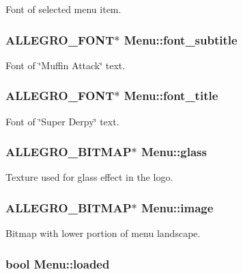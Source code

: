 Font of selected menu item. \hypertarget{structMenu_a18d7377e798bac336e55e253243d4e13}{
\subsubsection[{font\-\_\-subtitle}]{\setlength{\rightskip}{0pt plus 5cm}A\-L\-L\-E\-G\-R\-O\-\_\-\-F\-O\-N\-T$\ast$ Menu\-::font\-\_\-subtitle}}\label{structMenu_a18d7377e798bac336e55e253243d4e13}
Font of \char`\"{}\-Muffin Attack\char`\"{} text. \hypertarget{structMenu_aac0297cac51099ec75020a510a6dcbb3}{
\subsubsection[{font\-\_\-title}]{\setlength{\rightskip}{0pt plus 5cm}A\-L\-L\-E\-G\-R\-O\-\_\-\-F\-O\-N\-T$\ast$ Menu\-::font\-\_\-title}}\label{structMenu_aac0297cac51099ec75020a510a6dcbb3}
Font of \char`\"{}\-Super Derpy\char`\"{} text. \hypertarget{structMenu_ad9d4472398e580ffb12c7d7773e8cab8}{
\subsubsection[{glass}]{\setlength{\rightskip}{0pt plus 5cm}A\-L\-L\-E\-G\-R\-O\-\_\-\-B\-I\-T\-M\-A\-P$\ast$ Menu\-::glass}}\label{structMenu_ad9d4472398e580ffb12c7d7773e8cab8}
Texture used for glass effect in the logo. \hypertarget{structMenu_a7ac035a3356434a3ce6eae45f876eba9}{
\subsubsection[{image}]{\setlength{\rightskip}{0pt plus 5cm}A\-L\-L\-E\-G\-R\-O\-\_\-\-B\-I\-T\-M\-A\-P$\ast$ Menu\-::image}}\label{structMenu_a7ac035a3356434a3ce6eae45f876eba9}
Bitmap with lower portion of menu landscape. \hypertarget{structMenu_afd245b822f2805677609fc0f78ee59ac}{
\subsubsection[{loaded}]{\setlength{\rightskip}{0pt plus 5cm}bool Menu\-::loaded}}\label{structMenu_afd245b822f2805677609fc0f78ee59ac}
